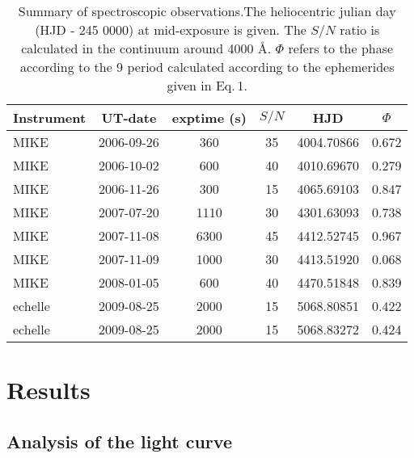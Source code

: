 \documentclass[useAMS,usenatbib]{mn2e}
\begin{document}
\begin{table}
\centering
 \caption{Summary of spectroscopic observations.The heliocentric julian day (HJD - 245 0000) at mid-exposure  is given. 
 The $S/N$ ratio is calculated in the continuum around 4000 \AA. 
 $\Phi$  refers to the phase according to the 9  period calculated according to the ephemerides given in Eq.\,1.}
 \begin{tabular}{@{}lccccc@{}}
 \hline
Instrument &UT-date &exptime (s) &$S/N$ &HJD &$\Phi$\\
\hline
MIKE &2006-09-26 & 	360	&35 &4004.70866	&0.672\\
MIKE & 2006-10-02& 	600	 &40 &4010.69670	&0.279 \\
MIKE &2006-11-26 	&300 &15	&4065.69103	&0.847\\
MIKE &2007-07-20 & 	1110&30	&4301.63093	&0.738\\
MIKE &2007-11-08 &	6300&45	&4412.52745	&0.967\\
MIKE &2007-11-09 & 	1000&30&	4413.51920&	0.068\\
MIKE &2008-01-05 & 	600	&40&4470.51848	&0.839\\
echelle &2009-08-25 &	2000&15 &	5068.80851&	0.422\\
echelle &2009-08-25 &	2000&15 &	5068.83272&	0.424\\
 \hline
\end{tabular}
\end{table}










\section{Results}

 \subsection{Analysis of the light curve}
 
\end{document}
